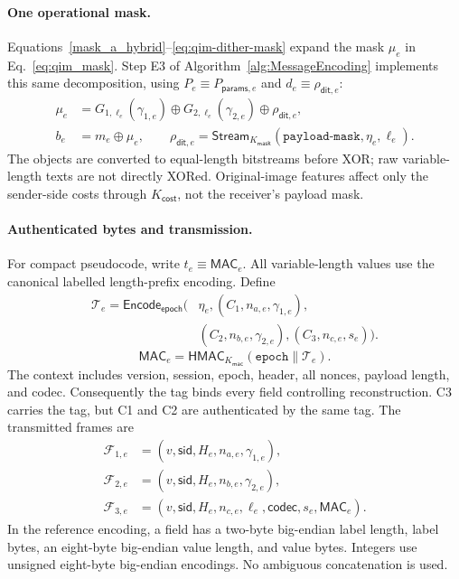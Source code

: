 \documentclass[pdflatex,sn-mathphys-num]{sn-jnl}%
\theoremstyle{definition}
\theoremstyle{game}
\theoremstyle{thmstyleone}%
\theoremstyle{thmstyletwo}%
\theoremstyle{thmstylethree}%
\begin{document}
\paragraph{One operational mask.}
Equations~\eqref{mask_a_hybrid}--\eqref{eq:qim-dither-mask} expand the
mask $\mu_e$ in Eq.~\eqref{eq:qim_mask}. Step E3 of
Algorithm~\ref{alg:MessageEncoding} implements this same decomposition,
using $P_e\equiv P_{\mathsf{params},e}$ and
$d_e\equiv\rho_{\mathsf{dit},e}$:
\begin{align}\label{mask_a_hybrid}
\mu_e&=G_{1,\ell_e}(\gamma_{1,e})\oplus G_{2,\ell_e}(\gamma_{2,e})
       \oplus\rho_{\mathsf{dit},e},\\
\label{eq:qim-dither-mask}
b_e&=m_e\oplus\mu_e,\qquad
\rho_{\mathsf{dit},e}=\mathsf{Stream}_{K_{\mathsf{mask}}}(\texttt{payload-mask},\eta_e,\ell_e).
\end{align}
The objects are converted to equal-length bitstreams before XOR; raw variable-length
texts are not directly XORed. Original-image features affect only the
sender-side costs through $K_{\mathsf{cost}}$, not the receiver's payload mask.

\paragraph{Authenticated bytes and transmission.}
For compact pseudocode, write $t_e\equiv\mathsf{MAC}_e$.
All variable-length values use the canonical labelled length-prefix encoding.
Define
\begin{equation}\label{eq:epoch-transcript}
\begin{aligned}
\mathcal T_e=\mathsf{Encode}_{\mathsf{epoch}}\bigl(
 &\eta_e,(C_1,n_{a,e},\gamma_{1,e}),\\
 &(C_2,n_{b,e},\gamma_{2,e}),(C_3,n_{c,e},s_e)\bigr).
\end{aligned}
\end{equation}
\begin{equation}\label{MAC}
\mathsf{MAC}_e=\mathsf{HMAC}_{K_{\mathsf{mac}}}
 (\texttt{epoch}\parallel\mathcal T_e).
\end{equation}
The context includes version, session, epoch, header, all nonces, payload length,
and codec. Consequently the tag binds every field controlling reconstruction.
C3 carries the tag, but C1 and C2 are authenticated by the same tag.
The transmitted frames are
\begin{align}\label{eq:trans}
\mathcal F_{1,e}&=(v,\mathsf{sid},H_e,n_{a,e},\gamma_{1,e}),\nonumber\\
\mathcal F_{2,e}&=(v,\mathsf{sid},H_e,n_{b,e},\gamma_{2,e}),\nonumber\\
\mathcal F_{3,e}&=(v,\mathsf{sid},H_e,n_{c,e},\ell_e,\mathsf{codec},s_e,\mathsf{MAC}_e).
\end{align}
In the reference encoding, a field has a two-byte big-endian label length,
label bytes, an eight-byte big-endian value length, and value bytes. Integers
use unsigned eight-byte big-endian encodings. No ambiguous concatenation is used.
\end{document}
